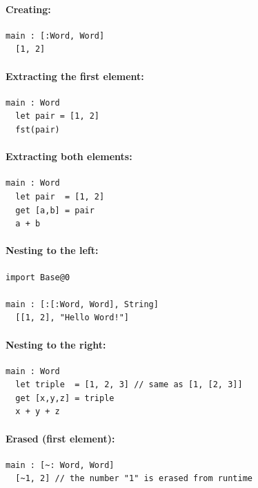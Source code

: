 \documentclass{article}
\theoremstyle{definition}
\theoremstyle{theorem}
\begin{document}
\paragraph{Creating:}

\begin{lstlisting}
main : [:Word, Word]
  [1, 2]
\end{lstlisting}

\paragraph{Extracting the first element:}

\begin{lstlisting}
main : Word
  let pair = [1, 2]
  fst(pair)
\end{lstlisting}

\paragraph{Extracting both elements:}

\begin{lstlisting}
main : Word
  let pair  = [1, 2]
  get [a,b] = pair
  a + b
\end{lstlisting}

\paragraph{Nesting to the left:}

\begin{lstlisting}
import Base@0

main : [:[:Word, Word], String]
  [[1, 2], "Hello Word!"]
\end{lstlisting}

\paragraph{Nesting to the right:}

\begin{lstlisting}
main : Word
  let triple  = [1, 2, 3] // same as [1, [2, 3]]
  get [x,y,z] = triple
  x + y + z
\end{lstlisting}

\paragraph{Erased (first element):}

\begin{lstlisting}
main : [~: Word, Word]
  [~1, 2] // the number "1" is erased from runtime
\end{lstlisting}
\end{document}
